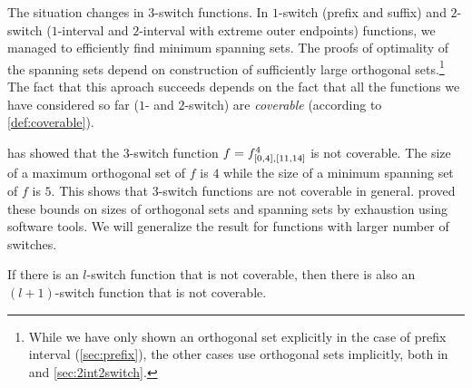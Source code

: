 The situation changes in $3$-switch functions.
In $1$-switch (prefix and suffix)
and $2$-switch ($1$-interval and $2$-interval
with extreme outer endpoints)
functions,
we managed to efficiently find minimum spanning sets.
The proofs of optimality of the spanning sets
depend on construction of sufficiently large
orthogonal sets.\footnote{While we have only shown
an orthogonal set explicitly
in the case of prefix interval (\autoref{sec:prefix}),
the other cases use orthogonal sets implicitly,
both in \citep{Schieber2005154}
and \autoref{sec:2int2switch}.}
The fact that this aproach succeeds
depends on the fact that all the functions we have considered so far ($1$- and $2$-switch)
are \emph{coverable}
(according to \cref{def:coverable}).

\citeauthor{Dubovsky2012} has showed that
the $3$-switch function
$f = f^{4}_{[0, 4], [11, 14]}$ is not coverable.
The size of a maximum orthogonal set of $f$ is $4$
while the size of a minimum spanning set of $f$ is $5$.
\citep[p.~32]{Dubovsky2012}
This shows that $3$-switch functions are not coverable in general.
\citeauthor{Dubovsky2012} proved these bounds
on sizes of orthogonal sets and spanning sets
by exhaustion using software tools.
We will generalize the result for functions
with larger number of switches.

\begin{lemma}
\label{lemma:noncoverableinduction}
If there is an $l$-switch function that is not coverable,
then there is also an $(l+1)$-switch function
that is not coverable.
\end{lemma}


